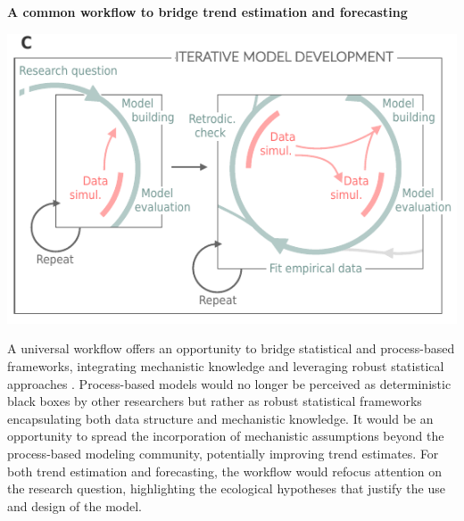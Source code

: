 \documentclass[11pt]{article}
\begin{document}
\begin{tcolorbox}
{\begin{multicols}{2}
\vfill

\end{multicols}}

\centerline{\bf A common workflow to bridge trend estimation and forecasting} %
\vspace*{-3mm}
{\begin{multicols}{2}
\begin{minipage}[t]{\linewidth}
	\vfill
\includegraphics[width=\linewidth]{figures/iterativeworkflow_details}
\vfill
\vspace*{3mm}
\end{minipage}

\columnbreak
\vspace*{1mm}
A universal workflow offers an opportunity to bridge statistical and process-based frameworks, integrating mechanistic knowledge and leveraging robust statistical approaches \citep[e.g.][]{rounce2020quantifying}. Process-based models would no longer be perceived as deterministic black boxes by other researchers but rather as robust statistical frameworks encapsulating both data structure and mechanistic knowledge. It would be an opportunity to spread the incorporation of mechanistic assumptions beyond the process-based modeling community, potentially improving trend estimates. For both trend estimation and forecasting, the workflow would refocus attention on the research question, highlighting the ecological hypotheses that justify the use and design of the model.

\end{multicols}}

\end{tcolorbox}
\end{document}
